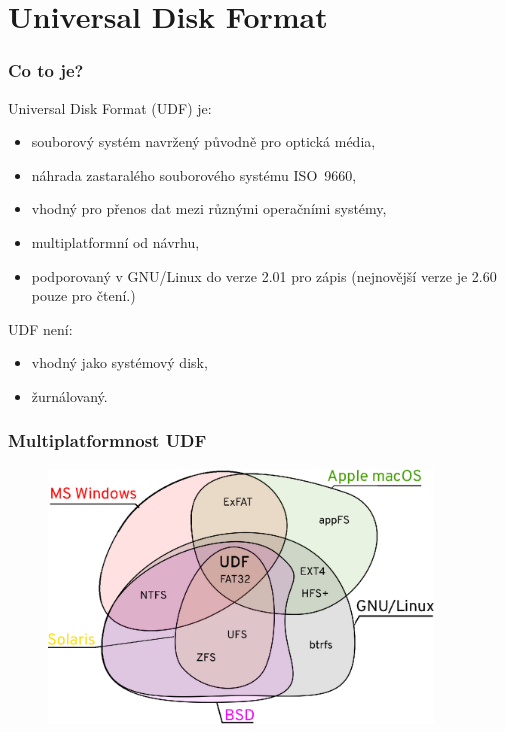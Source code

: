 \documentclass[aspectratio=169]{beamer}
\begin{document}
	\section{Universal Disk Format}
		\begin{frame}
			\frametitle{Co to je?}
            \vspace{40pt}
            \huge
            Universal Disk Format (UDF) je:
            \begin{itemize}
                \Large\item souborový systém navržený původně pro optická média,
                \Large\item náhrada zastaralého souborového systému ISO~9660,
                \Large\item vhodný pro přenos dat mezi různými operačními systémy,
                \Large\item multiplatformní od návrhu,
                \Large\item podporovaný v GNU/Linux do verze 2.01 pro zápis (nejnovější verze je 2.60 pouze pro čtení.)
%
            \end{itemize}
            UDF není:
            \begin{itemize}
                \Large\item vhodný jako systémový disk,
                \Large\item žurnálovaný.
            \end{itemize}
        \end{frame}
		\begin{frame}
			\frametitle{Multiplatformnost UDF}
			\vspace{40 pt}
			\center
            \begin{figure}
			    \includegraphics[width=10.2cm]{udf-podpora.eps}
            \end{figure}
		\end{frame}
\end{document}
